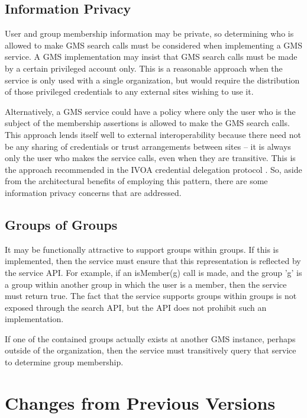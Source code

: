 \documentclass[11pt,a4paper]{ivoa}
\begin{document}
\subsection{Information Privacy}
\label{subsec:infopriv}

User and group membership information may be private, so determining who is allowed to make GMS search calls must be considered when implementing a GMS service.  A GMS implementation may insist that GMS search calls must be made by a certain privileged account only.  This is a reasonable approach when the service is only used with a single organization, but would require the distribution of those privileged credentials to any external sites wishing to use it.

Alternatively, a GMS service could have a policy where only the user who is the subject of the membership assertions is allowed to make the GMS search calls.  This approach lends itself well to external interoperability because there need not be any sharing of credentials or trust arrangements between sites -- it is always only the user who makes the service calls, even when they are transitive.  This is the approach recommended in the  IVOA credential delegation protocol \citep{2010ivoa.spec.0218P}.  So, aside from the architectural benefits of employing this pattern, there are some information privacy concerns that are addressed.

\subsection{Groups of Groups}

It may be functionally attractive to support groups within groups.  If this is implemented, then the service must ensure that this representation is reflected by the service API.  For example, if an isMember(g) call is made, and the group 'g' is a group within another group in which the user is a member, then the service must return true.  The fact that the service supports groups within groups is not exposed through the search API, but the API does not prohibit such an implementation.

If one of the contained groups actually exists at another GMS instance, perhaps outside of the organization, then the service must transitively query that service to determine group membership.

\appendix

\section{Changes from Previous Versions}
\end{document}
